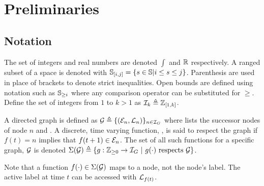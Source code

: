 \section{Preliminaries}
\subsection{Notation}\label{sec:notation}
The set of integers and real numbers are denoted $\int$ and $\mathbb{R}$ respectively. A ranged subset of a space is denoted with $\mathbb{S}_{[i,j]}=\{s\in\mathbb{S}|i\leq s\leq j\}$. Parenthesis are used in place of brackets to denote strict inequalities. Open bounds are defined using notation such as $\mathbb{S}_{\geq i}$ where any comparison operator can be substituted for $\geq$. Define the set of integers from $1$ to $k>1$ as $\mathcal{I}_{k}\triangleq\mathbb{Z}_{[1,k]}$.

A directed graph  is defined as $\graph\triangleq\{(\gnodeedges{n},\gnodelabel{n})\}_{n\in\idxset{\gnumnodes}}$ where  lists the successor nodes of node $n$ and . A discrete, time varying function, , is said to respect the graph if $f(t)=n$ implies that $f(t+1)\in\gnodeedges{n}$. The set of all such functions for a specific graph, $\mathcal{G}$ is denoted $\Sigma(\mathcal{G})\triangleq\{g:\int\rgeq{0}\rightarrow\idxset{\gnumnodes}\ |\ g(\cdot)\text{ respects }\graph\}$. 
\begin{remark}
Note that a function $f(\cdot)\in\Sigma(\mathcal{G})$ maps to a node, not the node's label. The active label at time $t$ can be accessed with $\mathcal{L}_{f(t)}$. 
\end{remark}

